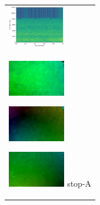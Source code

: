 \begin{enumerate}
\begin{end}
\begin{figure}[htbp]
\begin{tabular}{l}
\begin{minipage}{0.165\hsize}
\begin{center}
        \end{center}
      \end{minipage}
      \begin{minipage}{0.165\hsize}
        \begin{center}
          \includegraphics[clip, width=2.5cm]{./Figures/sound_stop.eps}
        \end{center}
      \end{minipage}
\\  %
      \begin{minipage}{0.165\hsize}
        \begin{center}
          \includegraphics[clip, width=2.5cm]{./Figures/optic_stop1-1.eps}
          \hspace{0.3cm} { }
        \end{center}
      \end{minipage}
      \begin{minipage}{0.165\hsize}
        \begin{center}
          \includegraphics[clip, width=2.5cm]{./Figures/optic_stop1-2.eps}
          \hspace{0.0cm} { }
        \end{center}
      \end{minipage}
      \begin{minipage}{0.165\hsize}
        \begin{center}
          \includegraphics[clip, width=2.5cm]{./Figures/optic_stop1-3.eps}
          \hspace{2.0cm} {stop-A}
        \end{center}
      \end{minipage}

\end{tabular}
\end{figure}
\end{end}
\end{enumerate}

